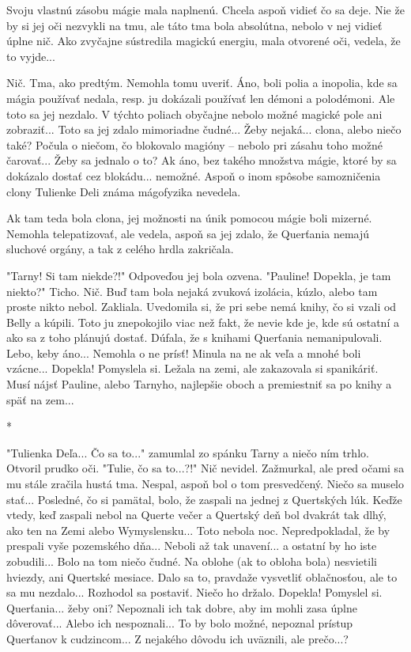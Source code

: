 \documentclass{book}
\begin{document}
Svoju vlastnú zásobu mágie mala naplnenú. Chcela aspoň vidieť čo sa deje. Nie že by si jej oči nezvykli na tmu, ale táto tma bola absolútna, nebolo v nej vidieť úplne nič. Ako zvyčajne sústredila magickú energiu, mala otvorené oči, vedela, že to vyjde...

Nič. Tma, ako predtým. Nemohla tomu uveriť. Áno, boli polia a inopolia, kde sa mágia používať nedala, resp. ju dokázali používať len démoni a polodémoni. Ale toto sa jej nezdalo. V týchto poliach obyčajne nebolo možné magické pole ani zobraziť... Toto sa jej zdalo mimoriadne čudné... Žeby nejaká... clona, alebo niečo také? Počula o niečom, čo blokovalo magióny – nebolo pri zásahu toho možné čarovať... Žeby sa jednalo o to? Ak áno, bez takého množstva mágie, ktoré by sa dokázalo dostať cez blokádu... nemožné. Aspoň o inom spôsobe samozničenia clony Tulienke Deli známa mágofyzika nevedela.

Ak tam teda bola clona, jej možnosti na únik pomocou mágie boli mizerné. Nemohla telepatizovať, ale vedela, aspoň sa jej zdalo, že Querťania nemajú sluchové orgány, a tak z celého hrdla zakričala.

"$ $Tarny! Si tam niekde?!"$ $ Odpoveďou jej bola ozvena. "$ $Pauline! Dopekla, je tam niekto?"$ $ Ticho. Nič. Buď tam bola nejaká zvuková izolácia, kúzlo, alebo tam proste nikto nebol. Zakliala. Uvedomila si, že pri sebe nemá knihy, čo si vzali od Belly a kúpili. Toto ju znepokojilo viac než fakt, že nevie kde je, kde sú ostatní a ako sa z toho plánujú dostať. Dúfala, že s knihami Querťania nemanipulovali. Lebo, keby áno... Nemohla o ne prísť! Minula na ne ak veľa a mnohé boli vzácne... Dopekla! Pomyslela si. Ležala na zemi, ale zakazovala si spanikáriť. Musí nájsť Pauline, alebo Tarnyho, najlepšie oboch a premiestniť sa po knihy a späť na zem...

\begin{center}

*

\end{center}

"$ $Tulienka Deľa... Čo sa to..."$ $ zamumlal zo spánku Tarny a niečo ním trhlo. Otvoril prudko oči. "$ $Tulie, čo sa to...?!"$ $ Nič nevidel. Zažmurkal, ale pred očami sa mu stále zračila hustá tma. Nespal, aspoň bol o tom presvedčený. Niečo sa muselo stať... Posledné, čo si pamätal, bolo, že zaspali na jednej z Quertských lúk. Keďže vtedy, keď zaspali nebol na Querte večer a Quertský deň bol dvakrát tak dlhý, ako ten na Zemi alebo Wymyslensku... Toto nebola noc. Nepredpokladal, že by prespali vyše pozemského dňa... Neboli až tak unavení... a ostatní by ho iste zobudili... Bolo na tom niečo čudné. Na oblohe (ak to obloha bola) nesvietili hviezdy, ani Quertské mesiace. Dalo sa to, pravdaže vysvetliť oblačnosťou, ale to sa mu nezdalo... Rozhodol sa postaviť. Niečo ho držalo. Dopekla! Pomyslel si. Querťania... žeby oni? Nepoznali ich tak dobre, aby im mohli zasa úplne dôverovať... Alebo ich nespoznali... To by bolo možné, nepoznal prístup Querťanov k cudzincom... Z nejakého dôvodu ich uväznili, ale prečo...?
\end{document}
